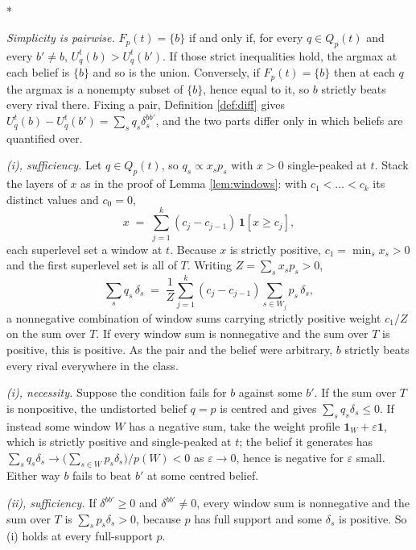\documentclass[12pt]{article}
\makeatletter
\theoremstyle{definition}
\renewenvironment{proof}[1][\proofname]{\par
  \pushQED{\qed}%
  \normalfont \topsep6\p@\@plus6\p@\relax
  \trivlist
  \item[\hskip\labelsep\itshape #1\@addpunct{.}]\mbox{}\\*
  \ignorespaces
}{%
  \popQED\endtrivlist\@endpefalse
}
\makeatother
\begin{document}
\begin{proof}[Proof of Theorem \ref{th:dominance}]
\emph{Simplicity is pairwise.} $F_p(t) = \{b\}$ if and only if, for every $q \in Q_p(t)$ and every $b' \neq b$, $U^t_q(b) > U^t_q(b')$. If those strict inequalities hold, the argmax at each belief is $\{b\}$ and so is the union. Conversely, if $F_p(t) = \{b\}$ then at each $q$ the argmax is a nonempty subset of $\{b\}$, hence equal to it, so $b$ strictly beats every rival there. Fixing a pair, Definition \ref{def:diff} gives $U^t_q(b) - U^t_q(b') = \sum_s q_s \delta^{bb'}_s$, and the two parts differ only in which beliefs are quantified over.

\emph{(i), sufficiency.} Let $q \in Q_p(t)$, so $q_s \propto x_s p_s$ with $x > 0$ single-peaked at $t$. Stack the layers of $x$ as in the proof of Lemma \ref{lem:windows}: with $c_1 < \dots < c_k$ its distinct values and $c_0 = 0$,
\[
x \;=\; \sum_{j=1}^{k} (c_j - c_{j-1})\, \mathbf{1}[x \ge c_j],
\]
each superlevel set a window at $t$. Because $x$ is strictly positive, $c_1 = \min_s x_s > 0$ and the first superlevel set is all of $T$. Writing $Z = \sum_s x_s p_s > 0$,
\[
\sum_s q_s\, \delta_s \;=\; \frac{1}{Z} \sum_{j=1}^{k} (c_j - c_{j-1}) \sum_{s \in W_j} p_s\, \delta_s ,
\]
a nonnegative combination of window sums carrying strictly positive weight $c_1/Z$ on the sum over $T$. If every window sum is nonnegative and the sum over $T$ is positive, this is positive. As the pair and the belief were arbitrary, $b$ strictly beats every rival everywhere in the class.

\emph{(i), necessity.} Suppose the condition fails for $b$ against some $b'$. If the sum over $T$ is nonpositive, the undistorted belief $q = p$ is centred and gives $\sum_s q_s \delta_s \le 0$. If instead some window $W$ has a negative sum, take the weight profile $\mathbf{1}_W + \varepsilon \mathbf{1}$, which is strictly positive and single-peaked at $t$; the belief it generates has $\sum_s q_s \delta_s \to \bigl(\sum_{s \in W} p_s \delta_s\bigr)/p(W) < 0$ as $\varepsilon \to 0$, hence is negative for $\varepsilon$ small. Either way $b$ fails to beat $b'$ at some centred belief.

\emph{(ii), sufficiency.} If $\delta^{bb'} \ge 0$ and $\delta^{bb'} \neq 0$, every window sum is nonnegative and the sum over $T$ is $\sum_s p_s \delta_s > 0$, because $p$ has full support and some $\delta_s$ is positive. So (i) holds at every full-support $p$.


\end{proof}
\end{document}
